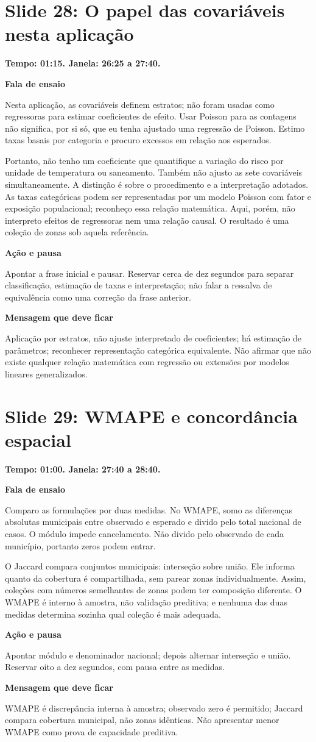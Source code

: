 \documentclass[11pt,a4paper]{article}
\newcommand{\bloco}[1]{\par\Needspace{3\baselineskip}\textbf{#1}\par}
\newcommand{\slide}[2]{\Needspace{13\baselineskip}\section*{Slide #1: #2}}
\begin{document}
\par\begin{minipage}{\textwidth}
\slide{28}{O papel das covariáveis nesta aplicação}
{\color{azul}\textbf{Tempo: 01:15. Janela: 26:25 a 27:40.}}\par
\bloco{Fala de ensaio}
Nesta aplicação, as covariáveis definem estratos; não foram usadas como regressoras para estimar coeficientes de efeito. Usar Poisson para as contagens não significa, por si só, que eu tenha ajustado uma regressão de Poisson. Estimo taxas basais por categoria e procuro excessos em relação aos esperados.

Portanto, não tenho um coeficiente que quantifique a variação do risco por unidade de temperatura ou saneamento. Também não ajusto as sete covariáveis simultaneamente. A distinção é sobre o procedimento e a interpretação adotados. As taxas categóricas podem ser representadas por um modelo Poisson com fator e exposição populacional; reconheço essa relação matemática. Aqui, porém, não interpreto efeitos de regressoras nem uma relação causal. O resultado é uma coleção de zonas sob aquela referência.
\bloco{Ação e pausa}
Apontar a frase inicial e pausar. Reservar cerca de dez segundos para separar classificação, estimação de taxas e interpretação; não falar a ressalva de equivalência como uma correção da frase anterior.
\bloco{Mensagem que deve ficar}
Aplicação por estratos, não ajuste interpretado de coeficientes; há estimação de parâmetros; reconhecer representação categórica equivalente. Não afirmar que não existe qualquer relação matemática com regressão ou extensões por modelos lineares generalizados.
\end{minipage}\par\bigskip
\par\begin{minipage}{\textwidth}
\slide{29}{WMAPE e concordância espacial}
{\color{azul}\textbf{Tempo: 01:00. Janela: 27:40 a 28:40.}}\par
\bloco{Fala de ensaio}
Comparo as formulações por duas medidas. No WMAPE, somo as diferenças absolutas municipais entre observado e esperado e divido pelo total nacional de casos. O módulo impede cancelamento. Não divido pelo observado de cada município, portanto zeros podem entrar.

O Jaccard compara conjuntos municipais: interseção sobre união. Ele informa quanto da cobertura é compartilhada, sem parear zonas individualmente. Assim, coleções com números semelhantes de zonas podem ter composição diferente. O WMAPE é interno à amostra, não validação preditiva; e nenhuma das duas medidas determina sozinha qual coleção é mais adequada.
\bloco{Ação e pausa}
Apontar módulo e denominador nacional; depois alternar interseção e união. Reservar oito a dez segundos, com pausa entre as medidas.
\bloco{Mensagem que deve ficar}
WMAPE é discrepância interna à amostra; observado zero é permitido; Jaccard compara cobertura municipal, não zonas idênticas. Não apresentar menor WMAPE como prova de capacidade preditiva.
\end{minipage}\par\bigskip
\end{document}
